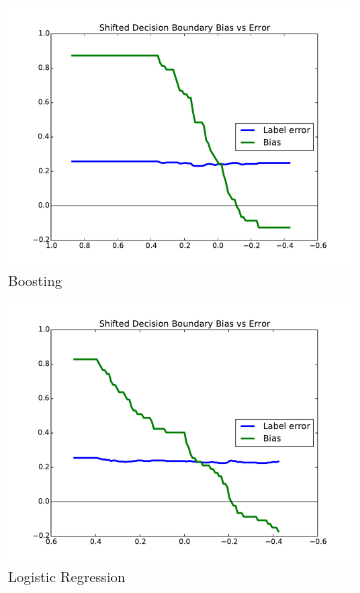 \documentclass[conference]{IEEEtran}
\begin{document}
\begin{figure}[t]
\centering
\begin{subfigure}{.7\columnwidth}
\includegraphics[width=\columnwidth]{images/german-boosting-T.pdf}%
\caption{Boosting}%
\label{fig:german_boosting_tradeoff}%
\end{subfigure}%
\begin{subfigure}{.7\columnwidth}
\includegraphics[width=\columnwidth]{images/german-lr-T.pdf}%
\caption{Logistic Regression}%
\label{fig:german_lr_tradeoff}%
\end{subfigure}%
\begin{subfigure}{.7\columnwidth}

\end{subfigure}
\end{figure}
\end{document}
